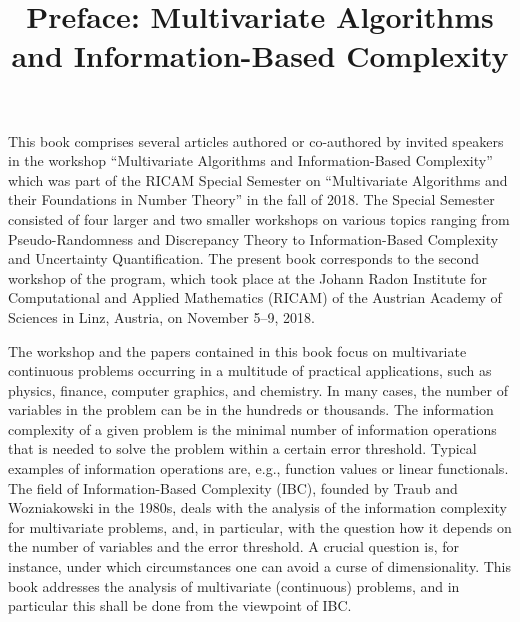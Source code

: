 \documentclass[11pt,a4paper]{article}
\begin{document}
 \title{Preface: Multivariate Algorithms and Information-Based Complexity}
% 
% 
 \maketitle
% 
% 
% 

This book comprises several articles authored or co-authored by invited speakers in the workshop ``Multivariate Algorithms 
and Information-Based Complexity'' which was part of the 
RICAM Special Semester on ``Multivariate Algorithms and their Foundations in Number Theory'' in the fall of 2018. 
The Special Semester consisted of four larger and two smaller workshops on various topics ranging from 
Pseudo-Randomness and Discrepancy Theory to Information-Based Complexity and Uncertainty Quantification. The present book 
corresponds to the second workshop of the program, which
took place at the Johann Radon Institute for Computational and Applied Mathematics (RICAM) of the Austrian Academy 
of Sciences in Linz, Austria, on November 5--9, 2018. 

The workshop and the papers contained in this book focus on 
multivariate continuous problems occurring in a multitude of practical applications, such as physics,
finance, computer graphics, and chemistry. In many cases, the number of variables in the problem
can be in the hundreds or thousands. The information complexity of a given problem is the minimal
number of information operations that is needed to solve the problem within a certain error
threshold. Typical examples of information operations are, e.g., function values or linear functionals.
The field of Information-Based Complexity (IBC), founded by Traub and Wozniakowski in the 1980s,
deals with the analysis of the information complexity for multivariate problems, and, in particular,
with the question how it depends on the number of variables and the error threshold. A crucial
question is, for instance, under which circumstances one can avoid a curse of dimensionality. This
book addresses the analysis of multivariate (continuous) problems, and in particular this shall be
done from the viewpoint of IBC.
\end{document}
